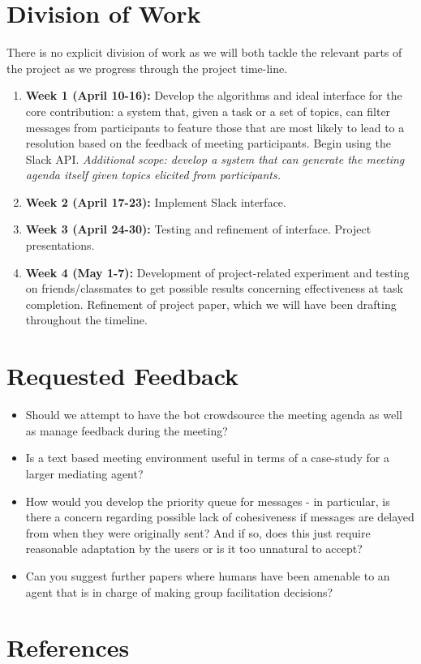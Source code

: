 \documentclass[final,authoryear,11pt,times]{elsarticle}
\begin{document}
\section{Division of Work}
	\label{sec:requestedfeedback}
	There is no explicit division of work as we will both tackle the relevant parts of the project as we progress through the project time-line. 
	\begin{enumerate}[noitemsep]
		\item{}\textbf{Week 1 (April 10-16):} Develop the algorithms and ideal interface for the core contribution: a system that, given a task or a set of topics, can filter messages from participants to feature those that are most likely to lead to a resolution based on the feedback of meeting participants. Begin using the Slack API. \textit{Additional scope: develop a system that can generate the meeting agenda itself given topics elicited from participants.}
		\item{}\textbf{Week 2 (April 17-23):} Implement Slack interface.
		\item{}\textbf{Week 3 (April 24-30):} Testing and refinement of interface. Project presentations.
		\item{}\textbf{Week 4 (May 1-7):} Development of project-related experiment and testing on friends/classmates to get possible results concerning effectiveness at task completion. Refinement of project paper, which we will have been drafting throughout the timeline.	
	\end{enumerate}

\section{Requested Feedback}
	\label{sec:requestedfeedback}
	\begin{itemize}[noitemsep]
		\item{}Should we attempt to have the bot crowdsource the meeting agenda as well as manage feedback during the meeting?
		\item{}Is a text based meeting environment useful in terms of a case-study for a larger mediating agent?
		\item{}How would you develop the priority queue for messages - in particular, is there a concern regarding possible lack of cohesiveness if messages are delayed from when they were originally sent? And if so, does this just require reasonable adaptation by the users or is it too unnatural to accept?
		\item{}Can you suggest further papers where humans have been amenable to an agent that is in charge of making group facilitation decisions?
	\end{itemize}

\section{References}



\end{document}
